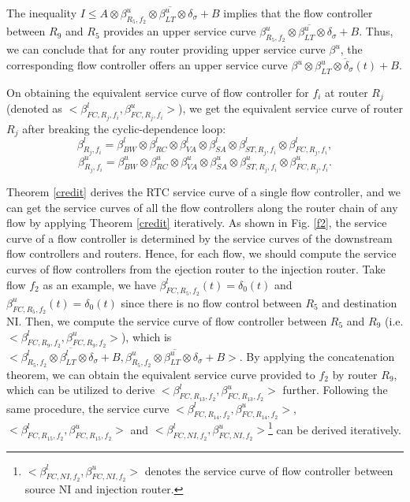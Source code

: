\documentclass[preprint]{elsarticle}
\begin{document}
\begin{pf}
The inequality $I\leq A\otimes \overline{\beta_{R_5,f_2}^u\otimes\beta_{LT}^u\otimes\delta_\sigma+B}$ implies that the flow controller between $R_9$ and $R_5$ provides an upper service curve $\overline{\beta_{R_5,f_2}^u\otimes\beta_{LT}^u\otimes\delta_\sigma+B}$. Thus, we can conclude that for any router providing upper service curve $\beta^u$, the corresponding flow controller offers an upper service curve $\overline{\beta^u\otimes\beta_{LT}^u\otimes\delta_\sigma(t)+B}$.
\end{pf}

On obtaining the equivalent service curve of flow controller for $f_i$ at router $R_j$ (denoted as $<\beta_{FC,R_j,f_i}^l,\beta_{FC,R_j,f_i}^u>$), we get the equivalent service curve of router $R_j$ after breaking the cyclic-dependence loop:
$$\beta_{R_j,f_i}^l=\beta_{BW}^l\otimes\beta_{RC}^l\otimes\beta_{VA}^l\otimes\beta_{SA}^l\otimes\beta_{ST,R_j,f_i}^l\otimes\beta_{FC,R_j,f_i}^l,$$
$$\beta_{R_j,f_i}^u=\beta_{BW}^u\otimes\beta_{RC}^u\otimes\beta_{VA}^u\otimes\beta_{SA}^u\otimes\beta_{ST,R_j,f_i}^u\otimes\beta_{FC,R_j,f_i}^u.$$

Theorem \ref{credit} derives the RTC service curve of a single flow controller, and we can get the service curves of all the flow controllers along the router chain of any flow by applying Theorem \ref{credit} iteratively. As shown in Fig. \ref{f2}, the service curve of a flow controller is determined by the service curves of the downstream flow controllers and routers. Hence, for each flow, we should compute the service curves of flow controllers from the ejection router to the injection router. Take flow $f_2$ as an example, we have $\beta_{FC,R_5,f_2}^l(t)=\delta_0(t)$ and $\beta_{FC,R_5,f_2}^u(t)=\delta_0(t)$ since there is no flow control between $R_5$ and destination NI. Then, we compute the service curve of flow controller between $R_5$ and $R_{9}$ (i.e. $<\beta_{FC,R_9,f_2}^l,\beta_{FC,R_9,f_2}^u>$), which is $<\overline{\beta_{R_5,f_2}^l\otimes\beta_{LT}^l\otimes\delta_\sigma+B},\overline{\beta_{R_5,f_2}^u\otimes\beta_{LT}^u\otimes\delta_\sigma+B}>$. By applying the concatenation theorem, we can obtain the equivalent service curve provided to $f_2$ by router $R_{9}$, which can be utilized to derive $<\beta_{FC,R_{13},f_2}^l,\beta_{FC,R_{13},f_2}^u>$ further. Following the same procedure, the service curve $<\beta_{FC,R_{14},f_2}^l,\beta_{FC,R_{14},f_2}^u>$, $<\beta_{FC,R_{15},f_2}^l,\beta_{FC,R_{15},f_2}^u>$ and $<\beta_{FC,NI,f_2}^l,\beta_{FC,NI,f_2}^u>$\footnote{$<\beta_{FC,NI,f_2}^l,\beta_{FC,NI,f_2}^u>$ denotes the service curve of flow controller between source NI and injection router.} can be derived iteratively.
\end{document}
